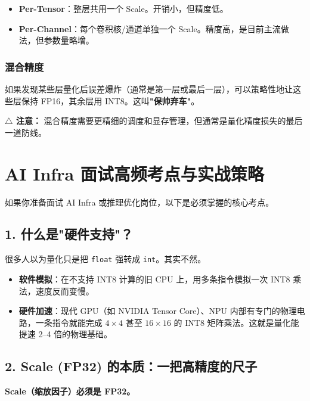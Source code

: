 \documentclass[fontset=fandol,11pt,a4paper]{ctexart}
\newcommand{\keyword}[1]{\textbf{\color{Primary}#1}}
\newcommand{\concept}[1]{\textbf{\color{Accent}#1}}
\newcommand{\codeinline}[1]{\texttt{\color{Primary!80}#1}}
\begin{document}
\begin{itemize}
  \item \keyword{Per-Tensor}：整层共用一个 Scale。开销小，但精度低。
  \item \keyword{Per-Channel}：每个卷积核/通道单独一个 Scale。精度高，是目前主流做法，但参数量略增。
\end{itemize}

\subsubsection{混合精度}

如果发现某些层量化后误差爆炸（通常是第一层或最后一层），可以策略性地让这些层保持 FP16，其余层用 INT8。这叫\concept{"保帅弃车"}。

\begin{warnbox}
\textbf{$\triangle$ 注意：} 混合精度需要更精细的调度和显存管理，但通常是量化精度损失的最后一道防线。
\end{warnbox}

\section{AI Infra 面试高频考点与实战策略}

如果你准备面试 AI Infra 或推理优化岗位，以下是必须掌握的核心考点。

\subsection{1. 什么是"硬件支持"？}

很多人以为量化只是把 \codeinline{float} 强转成 \codeinline{int}。其实不然。

\begin{itemize}
  \item \keyword{软件模拟}：在不支持 INT8 计算的旧 CPU 上，用多条指令模拟一次 INT8 乘法，速度反而变慢。
  \item \keyword{硬件加速}：现代 GPU（如 NVIDIA Tensor Core）、NPU 内部有专门的物理电路，一条指令就能完成 $4 \times 4$ 甚至 $16 \times 16$ 的 INT8 矩阵乘法。这就是量化能提速 2--4 倍的物理基础。
\end{itemize}

\subsection{2. Scale (FP32) 的本质：一把高精度的尺子}

\keyword{Scale（缩放因子）必须是 FP32。}
\end{document}
